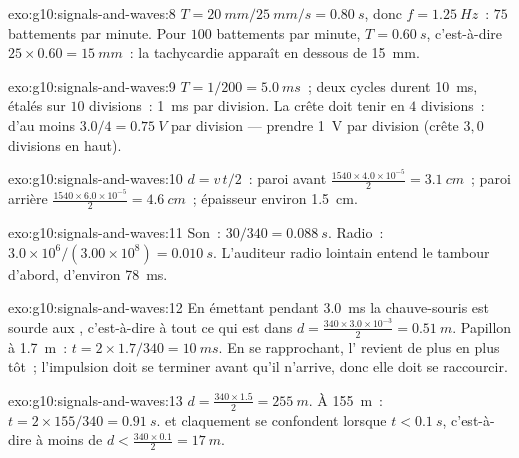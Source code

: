 \begin{solution}{exo:g10:signals-and-waves:8}
$T = \qty{20}{mm}/\qty{25}{mm/s} = \qty{0.80}{s}$, donc
$f = \qty{1.25}{Hz}$~: $75$ battements par minute. Pour $100$
battements par minute, $T = \qty{0.60}{s}$, c'est-à-dire
$25 \times 0.60 = \qty{15}{mm}$~: la tachycardie apparaît en dessous
de \qty{15}{mm}.
\end{solution}

\begin{solution}{exo:g10:signals-and-waves:9}
$T = 1/200 = \qty{5.0}{ms}$~; deux cycles durent \qty{10}{ms}, étalés
sur $10$ divisions~:  \qty{1}{ms} par division.
La crête doit tenir en $4$ divisions~:  d'au moins
$3.0/4 = \qty{0.75}{V}$ par division --- prendre \qty{1}{V} par
division (crête $3{,}0$ divisions en haut).
\end{solution}

\begin{solution}{exo:g10:signals-and-waves:10}
$d = v\,t/2$~: paroi avant
$\frac{1540 \times 4.0\times10^{-5}}{2} = \qty{3.1}{cm}$~; paroi
arrière $\frac{1540 \times 6.0\times10^{-5}}{2} = \qty{4.6}{cm}$~;
épaisseur environ \qty{1.5}{cm}.
\end{solution}

\begin{solution}{exo:g10:signals-and-waves:11}
Son~: $30/340 = \qty{0.088}{s}$. Radio~:
$3.0\times10^{6}/(3.00\times10^{8}) = \qty{0.010}{s}$. L'auditeur radio
lointain entend le tambour d'abord, d'environ \qty{78}{ms}.
\end{solution}

\begin{solution}{exo:g10:signals-and-waves:12}
En émettant pendant \qty{3.0}{ms} la chauve-souris est sourde aux
, c'est-à-dire à tout ce qui est dans
$d = \frac{340 \times 3.0\times10^{-3}}{2} = \qty{0.51}{m}$. Papillon
à \qty{1.7}{m}~: $t = 2 \times 1.7/340 = \qty{10}{ms}$. En se
rapprochant, l' revient de plus en plus tôt~; l'impulsion
doit se terminer avant qu'il n'arrive, donc elle doit se raccourcir.
\end{solution}

\begin{solution}{exo:g10:signals-and-waves:13}
$d = \frac{340 \times 1.5}{2} = \qty{255}{m}$. À \qty{155}{m}~:
$t = 2 \times 155/340 = \qty{0.91}{s}$.  et claquement se
confondent lorsque $t < \qty{0.1}{s}$, c'est-à-dire à moins de
$d < \frac{340 \times 0.1}{2} = \qty{17}{m}$.
\end{solution}

